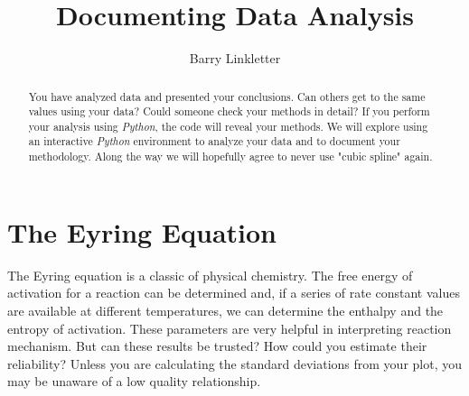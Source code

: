 \documentclass{tufte-handout}
\title{Documenting Data Analysis}
\author[Barry Linkletter]{Barry Linkletter}
\date{} %
\begin{document}
\justifying


\maketitle%

\begin{abstract}
You have analyzed data and presented your conclusions. Can others get to the same values using your data? Could someone check your methods in detail? If you perform your analysis using \textit{Python}, the code will reveal your methods. We will explore using an interactive \textit{Python} environment to analyze your data and to document your methodology. Along the way we will hopefully agree to never use "cubic spline" again.
\noindent {}

\end{abstract}


\section{The Eyring Equation}

The Eyring equation is a classic of physical chemistry.
 The free energy of activation for a reaction can be determined and, if a series of rate constant values are available at different temperatures, we can determine the enthalpy and the entropy of activation. These parameters are very helpful in interpreting reaction mechanism. But can these results be trusted? How could you estimate their reliability? Unless you are calculating the standard deviations from your plot, you may be unaware of a low quality relationship.
\end{document}
